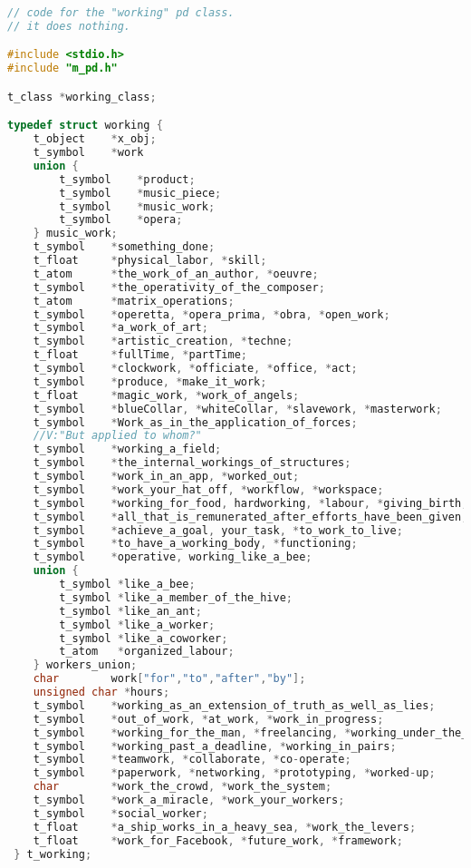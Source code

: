 \begin{flushleft}
\footnotesize
\begin{lstlisting}[caption={Pure Data working class},captionpos=b,language=C]
// code for the "working" pd class. 
// it does nothing.

#include <stdio.h>
#include "m_pd.h"

t_class *working_class;

typedef struct working {
	t_object 	*x_obj;
	t_symbol	*work
	union {
		t_symbol    *product;
		t_symbol 	*music_piece;
		t_symbol 	*music_work;
		t_symbol 	*opera;
	} music_work;
	t_symbol 	*something_done;
	t_float		*physical_labor, *skill;
	t_atom		*the_work_of_an_author, *oeuvre;
	t_symbol	*the_operativity_of_the_composer;
	t_atom		*matrix_operations;
	t_symbol	*operetta, *opera_prima, *obra, *open_work;
	t_symbol	*a_work_of_art;
	t_symbol	*artistic_creation, *techne;
	t_float		*fullTime, *partTime;
	t_symbol	*clockwork, *officiate, *office, *act;
	t_symbol	*produce, *make_it_work;
	t_float		*magic_work, *work_of_angels;
	t_symbol	*blueCollar, *whiteCollar, *slavework, *masterwork;
	t_symbol	*Work_as_in_the_application_of_forces;
	//V:"But applied to whom?"
	t_symbol	*working_a_field;
	t_symbol	*the_internal_workings_of_structures;
	t_symbol	*work_in_an_app, *worked_out;
	t_symbol	*work_your_hat_off, *workflow, *workspace;
	t_symbol	*working_for_food, hardworking, *labour, *giving_birth;
	t_symbol	*all_that_is_remunerated_after_efforts_have_been_given;
	t_symbol	*achieve_a_goal, your_task, *to_work_to_live;
	t_symbol	*to_have_a_working_body, *functioning;
	t_symbol	*operative, working_like_a_bee;
	union {
		t_symbol *like_a_bee;
		t_symbol *like_a_member_of_the_hive;
		t_symbol *like_an_ant;
		t_symbol *like_a_worker;
		t_symbol *like_a_coworker;
		t_atom	 *organized_labour;
	} workers_union;
	char 		work["for","to","after","by"];
	unsigned char *hours;
	t_symbol	*working_as_an_extension_of_truth_as_well_as_lies;
	t_symbol	*out_of_work, *at_work, *work_in_progress;
	t_symbol	*working_for_the_man, *freelancing, *working_under_the_table;
	t_symbol	*working_past_a_deadline, *working_in_pairs;
	t_symbol	*teamwork, *collaborate, *co-operate;
	t_symbol	*paperwork, *networking, *prototyping, *worked-up;
	char		*work_the_crowd, *work_the_system;
	t_symbol	*work_a_miracle, *work_your_workers;
	t_symbol	*social_worker;
	t_float		*a_ship_works_in_a_heavy_sea, *work_the_levers;
	t_float		*work_for_Facebook, *future_work, *framework;
 } t_working;
\end{lstlisting}
\end{flushleft}
